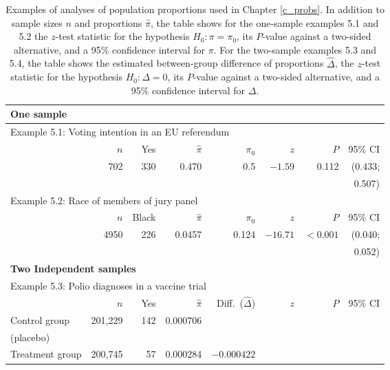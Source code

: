 \begin{table}[t]
\caption{Examples of analyses of population proportions used in Chapter
\ref{c_probs}. In addition to sample sizes $n$ and proportions
$\hat{\pi}$, the table shows for
the one-sample examples 5.1 and 5.2 the
$z$-test statistic for the
hypothesis $H_{0}: \pi=\pi_{0}$, its $P$-value against
a two-sided alternative, and a 95\% confidence interval for $\pi$.
For the two-sample examples 5.3 and 5.4, the table shows
the estimated between-group difference of proportions $\hat{\Delta}$,
the $z$-test statistic for the
hypothesis $H_{0}: \Delta=0$, its $P$-value against
a two-sided alternative, and a 95\% confidence interval for $\Delta$.
}
\label{t_probex}
\begin{small}
\begin{center}
\begin{tabular}{|lrrrrrrr|}\hline
\multicolumn{8}{|l|}{\rule[1mm]{0mm}{3mm}\textbf{One sample}} \\ \hline
\multicolumn{8}{|l|}{\rule[1mm]{0mm}{3mm}Example 5.1:
Voting intention in an EU referendum} \\
& $n$ & Yes & $\hat{\pi}$ & $\pi_{0}$ & $z$ & $P$ & 95\% CI \\ \hline
\rule[1mm]{0mm}{3mm} &
702 & 330 & 0.470 & 0.5 & $-1.59$ & 0.112 & (0.433;\\
& & & & & & & 0.507) \\ \hline
\multicolumn{8}{|l|}{\rule[1mm]{0mm}{3mm}Example 5.2: Race of members of jury panel} \\
& $n$ & Black & $\hat{\pi}$ & $\pi_{0}$ & $z$ & $P$ & 95\% CI \\ \hline
\rule[1mm]{0mm}{3mm} &
4950 & 226 & 0.0457 & 0.124& $-16.71$ & $<0.001$ & (0.040;\\
& & & & & & & 0.052) \\
\hline \hline
\multicolumn{8}{|l|}{\rule[1mm]{0mm}{3mm}\textbf{Two Independent samples}} \\ \hline
\multicolumn{8}{|l|}{\rule[1mm]{0mm}{3mm}Example 5.3: Polio diagnoses in a vaccine trial}\\
& $n$ & Yes & $\hat{\pi}$ & Diff.\ ($\hat{\Delta}$)& $z$ & $P$ & 95\% CI \\ \hline
\hspace*{.5em}\rule[1mm]{0mm}{3mm}Control group
& 201,229 & 142 & 0.000706 & & & &   \\
(placebo) & & & & & & & \\
\hspace*{.5em}Treatment group
& 200,745 & 57& 0.000284 & $-0.000422$

\end{tabular}
\end{center}
\end{small}
\end{table}

